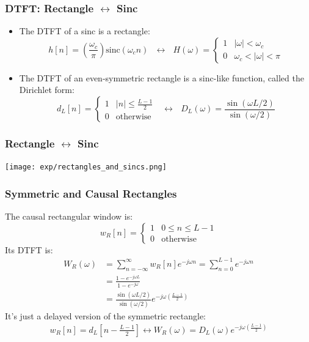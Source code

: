 \documentclass{beamer}
\begin{document}
\begin{frame}
  \frametitle{DTFT: Rectangle $\leftrightarrow$ Sinc}

  \begin{itemize}
  \item The DTFT of a sinc is a rectangle:
    \begin{displaymath}
      h[n] = \left(\frac{\omega_c}{\pi}\right)\mbox{sinc}(\omega_c n)
      ~~~\leftrightarrow~~~
      H(\omega)=\begin{cases}1&|\omega|<\omega_c\\
      0 & \omega_c<|\omega|<\pi
      \end{cases}
    \end{displaymath}
  \item The DTFT of an even-symmetric rectangle is a sinc-like function, called the
    Dirichlet form:
    \begin{displaymath}
      d_L[n] = \begin{cases}
        1 & |n|\le \frac{L-1}{2}\\
        0 &\mbox{otherwise}
      \end{cases}
      ~~~\leftrightarrow~~~
      D_L(\omega)= \frac{\sin(\omega L/2)}{\sin(\omega/2)}
    \end{displaymath}
  \end{itemize}
\end{frame}

\begin{frame}
  \frametitle{Rectangle $\leftrightarrow$ Sinc}

  \centerline{\texttt{[image: exp/rectangles\_and\_sincs.png]}}
\end{frame}

\begin{frame}
  \frametitle{Symmetric and Causal Rectangles}

  The causal rectangular window is:
  \begin{displaymath}
    w_R[n]=\left\{\begin{array}{ll}
    1 & 0\le n\le L-1\\
    0 &\mbox{otherwise}
    \end{array}\right.
  \end{displaymath}
  Its DTFT is:
  \begin{align*}
    W_R(\omega) &= \sum_{n=-\infty}^\infty w_R[n]e^{-j\omega n}
    = \sum_{n=0}^{L-1} e^{-j\omega n} \\
    &= \frac{1-e^{-j\omega L}}{1-e^{-j\omega}}\\
    &= \frac{\sin(\omega L/2)}{\sin(\omega/2)}e^{-j\omega\left(\frac{L-1}{2}\right)}
  \end{align*}
  It's just a delayed version of the symmetric rectangle:
  \begin{align*}
    w_R[n]=d_L\left[n-\frac{L-1}{2}\right] \leftrightarrow
    W_R(\omega) = D_L(\omega)e^{-j\omega\left(\frac{L-1}{2}\right)}
  \end{align*}
\end{frame}
\end{document}
